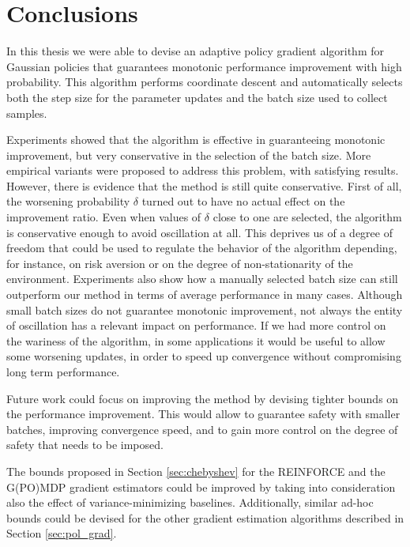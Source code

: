 \chapter{Conclusions}\label{chap:conclusion}
In this thesis we were able to devise an adaptive policy gradient algorithm for Gaussian policies that guarantees monotonic performance improvement with high probability. This algorithm performs coordinate descent and automatically selects both the step size for the parameter updates and the batch size used to collect samples. 

Experiments showed that the algorithm is effective in guaranteeing monotonic improvement, but very conservative in the selection of the batch size. More empirical variants were proposed to address this problem, with satisfying results. However, there is evidence that the method is still quite conservative.
First of all, the worsening probability $\delta$ turned out to have no actual effect on the improvement ratio. Even when values of $\delta$ close to one are selected, the algorithm is conservative enough to avoid oscillation at all. This deprives us of a degree of freedom that could be used to regulate the behavior of the algorithm depending, for instance, on risk aversion or on the degree of non-stationarity of the environment.
Experiments also show how a manually selected batch size can still outperform our method in terms of average performance in many cases. Although small batch sizes do not guarantee monotonic improvement, not always the entity of oscillation has a relevant impact on performance. If we had more control on the wariness of the algorithm, in some applications it would be useful to allow some worsening updates, in order to speed up convergence without compromising long term performance.

Future work could focus on improving the method by devising tighter bounds on the performance improvement.
This would allow to guarantee safety with smaller batches, improving convergence speed, and to gain more control on the degree of safety that needs to be imposed.

The bounds proposed in Section \ref{sec:chebyshev} for the REINFORCE and the G(PO)MDP gradient estimators could be improved by taking into consideration also the effect of variance-minimizing baselines. Additionally, similar ad-hoc bounds could be devised for the other gradient estimation algorithms described in Section \ref{sec:pol_grad}.

